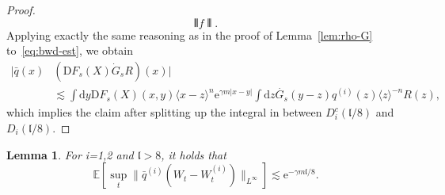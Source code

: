 \documentclass[11pt, a4paper]{scrartcl}
\numberwithin{equation}{section}
\theoremstyle{plain}
\newtheorem{lemma}[foo]{Lemma}
\theoremstyle{remark}
\newcommand{\mathD}{\mathrm{D}}
\newcommand{\mathd}{\mathrm{d}}
\newcommand{\mathe}{\mathrm{e}}
\begin{document}
\begin{proof}
\[     \interleave f \interleave . \]
  Applying exactly the same reasoning as in the proof of Lemma~\ref{lem:rho-G}
  to~\eqref{eq:bwd-est}, we obtain
  \begin{align*}
    | \bar{q} (x) &(\mathD F_s (X)  \dot{G}_s R) (x) | \\
    &\lesssim \int \mathd y
     \mathD F_s (X) (x, y) \langle x - z \rangle^n \mathe^{\gamma m | x - y |} 
     \int \mathd z \dot{G_s} (y - z) q^{(i)} (z) \langle z \rangle^{- n} R
     (z),
  \end{align*}
  which implies the claim after splitting up the integral in between $D_i^c
  (\mathfrak{l}/ 8)$ and $D_i (\mathfrak{l}/ 8)$.
\end{proof}

\begin{lemma}
  \label{lem:corr-W-Wi}For i=1,2 and $\mathfrak{l}> 8$, it holds that
  \[ \mathbb{E} [\sup_t \| \bar{q}^{(i)} (W_t - W_t^{(i)}) \|_{L^{\infty}}]
     \lesssim \mathe^{- \gamma m\mathfrak{l}/ 8} . \]
\end{lemma}
\end{document}
